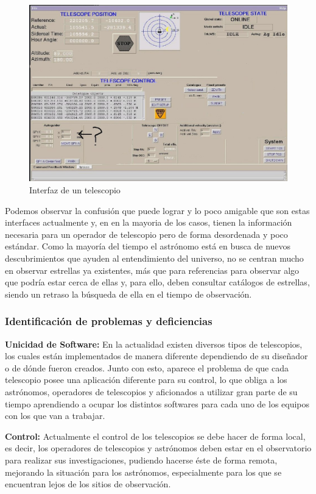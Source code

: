 \documentclass[letterpaper,titlepage,spanish,10pt]{article}
\begin{document}
\begin{figure}[h!]
 \centering
 \includegraphics[scale=0.5]{tele.eps}
 \caption{Interfaz de un telescopio}
\end{figure}

Podemos observar la confusi\'on que puede lograr y lo poco amigable que son estas 
interfaces actualmente y, en en la mayoria de los casos, tienen la informaci\'on 
necesaria para un operador de telescopio pero de forma desordenada y poco est\'andar.
 Como la mayor\'ia del tiempo el astr\'onomo est\'a en busca de nuevos descubrimientos 
que ayuden al entendimiento del universo, no se centran mucho en observar estrellas 
ya existentes, m\'as que para referencias para observar algo que podr\'ia estar 
cerca de ellas y, para ello, deben consultar cat\'alogos de estrellas, siendo un 
retraso la b\'usqueda de ella en el tiempo de observaci\'on.

\subsubsection{Identificaci\'on de problemas y deficiencias}
\textbf{Unicidad de Software:} En la actualidad existen diversos tipos de telescopios, 
los cuales est\'an implementados de manera diferente dependiendo de su dise\~nador o 
de d\'onde fueron creados. Junto con esto, aparece el problema de que cada telescopio 
posee una aplicaci\'on diferente para su control, lo que obliga a los astr\'onomos, 
operadores de telescopios y aficionados a utilizar gran parte de su tiempo aprendiendo 
a ocupar los distintos softwares para cada uno de los equipos con los que van a trabajar.

\textbf{Control:} Actualmente el control de los telescopios se debe hacer de forma local, 
es decir, los operadores de telescopios y astr\'onomos deben estar en el observatorio 
para realizar sus investigaciones, pudiendo hacerse \'este de forma remota, mejorando 
la situaci\'on para los astr\'onomos, especialmente para los que se encuentran lejos 
de los sitios de observaci\'on.
\end{document}
